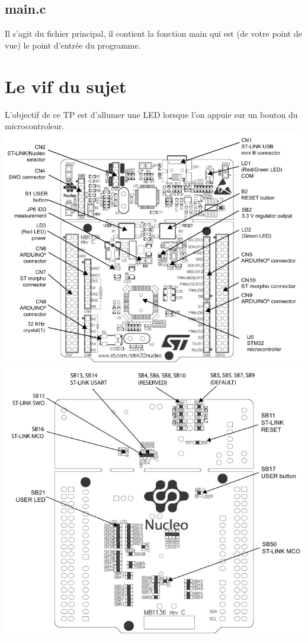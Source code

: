 \documentclass[a4paper,10pt]{article} %
\begin{document}
\subsection{main.c}
Il s'agit du fichier principal, il contient la fonction main qui est (de votre point de vue) le point d'entrée du programme.

\newpage

\section{Le vif du sujet}
L'objectif de ce TP est d'allumer une LED lorsque l'on appuie sur un bouton du microcontroleur.\\

\includegraphics[scale=0.28]{assets/stm32top.png}
\includegraphics[scale=0.28]{assets/stm32bot.png}
\end{document}
